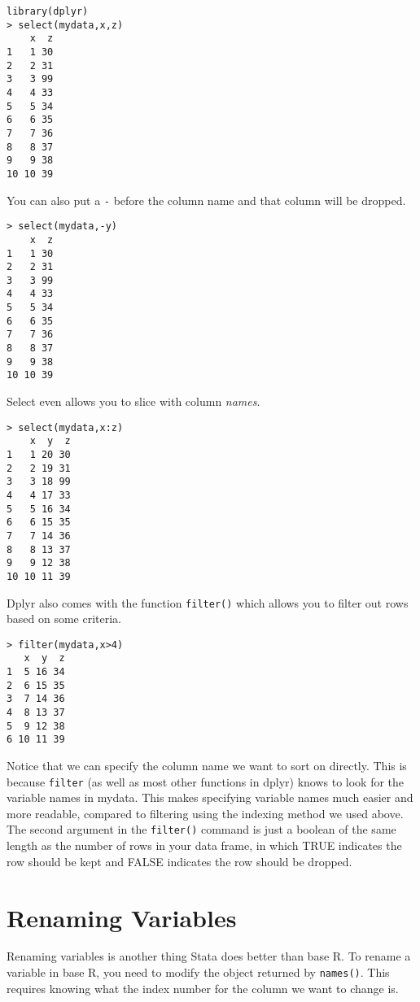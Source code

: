 \documentclass[12pt, oneside]{amsart}   	%
\begin{document}
\begin{verbatim}
library(dplyr)
> select(mydata,x,z)
    x  z
1   1 30
2   2 31
3   3 99
4   4 33
5   5 34
6   6 35
7   7 36
8   8 37
9   9 38
10 10 39
\end{verbatim}

You can also put a \texttt{-} before the column name and that column will be dropped.

\begin{verbatim}
> select(mydata,-y)
    x  z
1   1 30
2   2 31
3   3 99
4   4 33
5   5 34
6   6 35
7   7 36
8   8 37
9   9 38
10 10 39
\end{verbatim}

Select even allows you to slice with column \textit{names}.

\begin{verbatim}
> select(mydata,x:z)
    x  y  z
1   1 20 30
2   2 19 31
3   3 18 99
4   4 17 33
5   5 16 34
6   6 15 35
7   7 14 36
8   8 13 37
9   9 12 38
10 10 11 39
\end{verbatim}

Dplyr also comes with the function \texttt{filter()} which allows you to filter out rows based on some criteria.

\begin{verbatim}
> filter(mydata,x>4)
   x  y  z
1  5 16 34
2  6 15 35
3  7 14 36
4  8 13 37
5  9 12 38
6 10 11 39
\end{verbatim}

Notice that we can specify the column name we want to sort on directly. This is because \texttt{filter} (as well as most other functions in dplyr) knows to look for the variable names in mydata. This makes specifying variable names much easier and more readable, compared to filtering using the indexing method we used above. The second argument in the \texttt{filter()} command is just a boolean of the same length as the number of rows in your data frame, in which TRUE indicates the row should be kept and FALSE indicates the row should be dropped. 

\section{Renaming Variables}

Renaming variables is another thing Stata does better than base R. To rename a variable in base R, you need to modify the object returned by \texttt{names()}. This requires knowing what the index number for the column we want to change is. 
\end{document}
